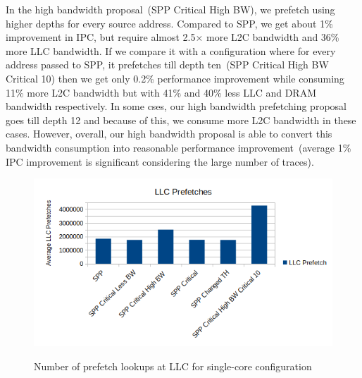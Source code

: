 In the high bandwidth proposal~(SPP Critical High BW), we prefetch using higher depths for every source address. Compared to SPP, we get about 1\% improvement in IPC, but require almost 2.5$\times$ more L2C bandwidth and 36\% more LLC bandwidth. If we compare it with a configuration where for every address passed to SPP, it prefetches till depth ten~(SPP Critical High BW Critical 10) then we get only 0.2\% performance improvement while consuming 11\% more L2C bandwidth but with 41\% and 40\% less LLC and DRAM bandwidth respectively. In some cses, our high bandwidth prefetching proposal goes till depth 12 and because of this, we consume more L2C bandwidth in these cases. However, overall, our high bandwidth proposal is able to convert this bandwidth consumption into reasonable performance improvement~(average 1\% IPC improvement is significant considering the large number of traces).
\begin{figure}[H]
{\includegraphics[scale=0.7]{images/single_core_LLC_Bandwidth.png}}
\caption{Number of prefetch lookups at LLC for single-core configuration}
\label{fig:llc-prefetch-count}
\end{figure}

